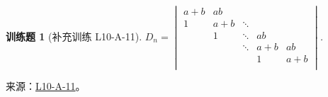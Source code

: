 \documentclass[UTF8,12pt,a4paper,fontset=fandol]{ctexart}
\newtheorem{exercise}{训练题}[section]
\begin{document}
\begin{exercise}[补充训练 L10-A-11]\label{prob:L10-A-11}
$D_n=\begin{vmatrix}
                a+b & ab  &        &     &     \\
                1   & a+b & \ddots &     &     \\
                    & 1   & \ddots & ab  &     \\
                    &     & \ddots & a+b & ab  \\
                    &     &        & 1   & a+b \\
            \end{vmatrix}$.
\end{exercise}
\noindent 来源：\href{https://github.com/yhwu-is/Linear-Algebra-Left-Undone/blob/new/%E8%AE%B2%E4%B9%89/%E4%B8%93%E9%A2%98/10%20%E8%A1%8C%E5%88%97%E5%BC%8F.tex}{L10-A-11}。
\end{document}
